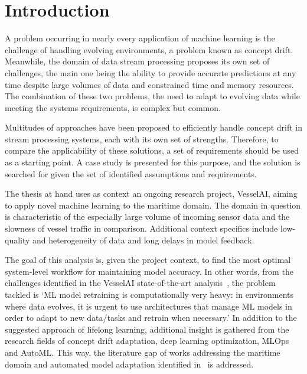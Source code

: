 \chapter{Introduction}
A problem occurring in nearly every application of machine learning is the challenge of handling evolving environments, a problem known as concept drift. Meanwhile, the domain of data stream processing proposes its own set of challenges, the main one being the ability to provide accurate predictions at any time despite large volumes of data and constrained time and memory resources. The combination of these two problems, the need to adapt to evolving data while meeting the systems requirements, is complex but common.

Multitudes of approaches have been proposed to efficiently handle concept drift in stream processing systems, each with its own set of strengths. Therefore, to compare the applicability of these solutions, a set of requirements should be used as a starting point. A case study is presented for this purpose, and the solution is searched for given the set of identified assumptions and requirements.

The thesis at hand uses as context an ongoing research project, VesselAI, aiming to apply novel machine learning to the maritime domain. The domain in question is characteristic of the especially large volume of incoming sensor data and the slowness of vessel traffic in comparison. Additional context specifics include low-quality and heterogeneity of data and long delays in model feedback. 

The goal of this analysis is, given the project context, to find the most optimal system-level workflow for maintaining model accuracy. In other words, from the challenges identified in the VesselAI state-of-the-art analysis~\cite{D1.1}, the problem tackled is ‘ML model retraining is computationally very heavy: in environments where data evolves, it is urgent to use architectures that manage ML models in order to adapt to new data/tasks and retrain when necessary.' In addition to the suggested approach of lifelong learning, additional insight is gathered from the research fields of concept drift adaptation, deep learning optimization, MLOps and AutoML. This way, the literature gap of works addressing the maritime domain and automated model adaptation identified in~\cite{D1.1} is addressed.


